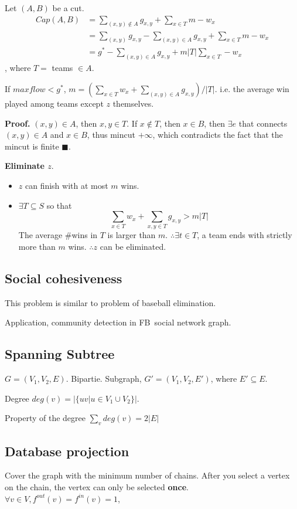 \documentclass[a4paper]{report}
\theoremstyle{definition}
\begin{document}
Let $(A, B)$ be a cut.
\begin{align*}
Cap(A, B) &= \sum_{(x,y)\notin A} g_{x,y}+\sum_{x\in T} m-w_x\\
&= \sum_{(x,y)}g_{x, y}-\sum_{(x, y)\in A} g_{x, y}+\sum_{x\in T}m-w_x\\
&= g^*-\sum_{(x, y)\in A} g_{x, y}+m|T|\sum_{x\in T}-w_x
\end{align*}
, where $T=$ teams $\in A$.

If $maxflow <g^*$, $m=(\sum_{x\in T} w_x+\sum_{(x,y)\in A} g_{x,y})/|T|$. i.e. the average win played among teams except $z$ themselves.

\textbf{Proof.} $(x,y)\in A$, then $x, y\in T$. If $x \notin T$, then $x \in B$, then $\exists e$ that connects $(x,y)\in A$ and $x\in B$, thus mincut $+\infty$, which contradicts the fact that the mincut is finite $\blacksquare$.

\textbf{Eliminate $z$}.
\begin{itemize}
\item $z$ can finish with at most $m$ wins.
\item $\exists T\subseteq S$ so that
$$
\sum_{x\in T} w_x + \sum_{x, y \in T} g_{x, y} > m|T|
$$
The average \#wins in $T$ is larger than $m$. $\therefore \exists t \in T$, a team ends with strictly more than $m$ wins. $\therefore z$  can be eliminated.
\end{itemize}

\subsection{Social cohesiveness}
This problem is similar to problem of baseball elimination.

Application, community detection in FB\ social network graph.

\subsection{Spanning Subtree}
$G=(V_1, V_2, E)$. Bipartie. Subgraph, $G'=(V_1, V_2, E')$, where $E'\subseteq E$.

Degree $deg(v)=|\{uv|u\in V_1\cup V_2\}|$.

Property of the degree $\sum_v deg(v)=2|E|$

\subsection{Database projection}
Cover the graph with the minimum number of chains. After you select a vertex on the chain, the vertex can only be selected \textbf{once}. $\forall v\in V, f^{out}(v)=f^{in}(v)=1$,
\end{document}
